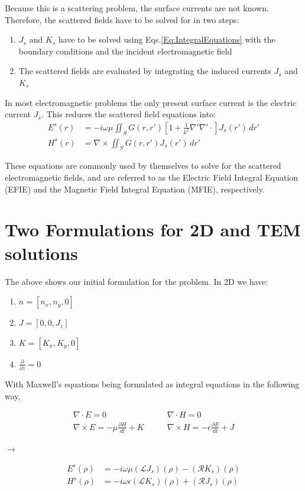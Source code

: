 \documentclass{article}
\newcommand{\0}{\varnothing}
\begin{document}
Because this is a scattering problem, the surface currents are not known. Therefore, the scattered fields have to be solved for in two steps:

\begin{enumerate}
\item $J_s$ and $K_s$ have to be solved using Eqs.\eqref{Eq:IntegralEquations} with the boundary conditions and the incident electromagnetic field
\item The scattered fields are evaluated by integrating the induced currents $J_s$ and $K_s$
\end{enumerate}

In most electromagnetic problems the only present surface current is the electric current $J_s$. This reduces the scattered field equations into:
\begin{align*}
    E^s(r) &= -i\omega\mu\iint_{S}G(r,r')[1+\frac{1}{k^2}\nabla'\nabla'\cdotp]J_s(r') \,dr'\\
    H^s(r) &= \nabla \times \iint_{S}G(r,r')J_s(r') \,dr'    
\end{align*}

These equations are commonly used by themselves to solve for the scattered electromagnetic fields, and are referred to as the Electric Field Integral Equation (EFIE) and the Magnetic Field Integral Equation (MFIE), respectively\cite{Method_Moments}.

\newpage
\section{Two Formulations for 2D and TEM solutions}

The above shows our initial formulation for the problem. In 2D we have:
\begin{enumerate}
    \item $n = [n_x,n_y,0]$
    \item $J = [0,0,J_z]$
    \item $K = [K_x,K_y,0]$
    \item $\frac{\partial}{\partial z} = 0$
\end{enumerate}
With Maxwell's equations being formulated as integral equations in the following way,

\begin{minipage}{0.45\textwidth}
\begin{align*}
\nabla \cdot E = 0 \quad \quad
& \nabla \cdot H = 0 \\
\nabla \times E = -\mu \frac{\partial H}{dt} + K\quad \quad 
& \nabla \times H = -\epsilon \frac{\partial E}{dt} + J
\end{align*}
\end{minipage}
$\longrightarrow$
\begin{minipage}{0.45\textwidth}
\begin{align*}
    E^s(\rho) &= -i\omega\mu(\mathcal{L}J_s)(\rho) - (\mathcal{R}K_s)(\rho)\\
    H^s(\rho) &= -i\omega\epsilon(\mathcal{L}K_s)(\rho) + (\mathcal{R}J_s)(\rho)
\end{align*}
\end{minipage}
\end{document}
